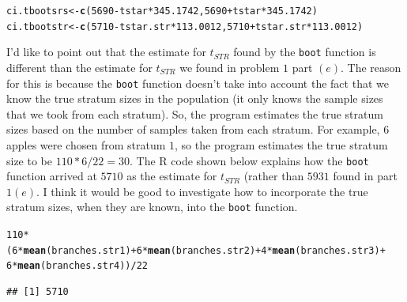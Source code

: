 \documentclass[12pt]{article}\usepackage[]{graphicx}\usepackage[]{color}
\makeatletter
\newcommand{\hlnum}[1]{\textcolor[rgb]{0.686,0.059,0.569}{#1}}%
\newcommand{\hlopt}[1]{\textcolor[rgb]{0,0,0}{#1}}%
\newcommand{\hlstd}[1]{\textcolor[rgb]{0.345,0.345,0.345}{#1}}%
\newcommand{\hlkwb}[1]{\textcolor[rgb]{0.69,0.353,0.396}{#1}}%
\newcommand{\hlkwd}[1]{\textcolor[rgb]{0.737,0.353,0.396}{\textbf{#1}}}%
\newenvironment{kframe}{%
 \def\at@end@of@kframe{}%
 \ifinner\ifhmode%
  \def\at@end@of@kframe{\end{minipage}}%
  \begin{minipage}{\columnwidth}%
 \fi\fi%
 \def\FrameCommand##1{\hskip\@totalleftmargin \hskip-\fboxsep
 \colorbox{shadecolor}{##1}\hskip-\fboxsep
     \hskip-\linewidth \hskip-\@totalleftmargin \hskip\columnwidth}%
 \MakeFramed {\advance\hsize-\width
   \@totalleftmargin\z@ \linewidth\hsize
   \@setminipage}}%
 {\par\unskip\endMakeFramed%
 \at@end@of@kframe}
\newenvironment{knitrout}{}{} %
\makeatother
\begin{document}
\begin{doublespacing}
\begin{enumerate}
\begin{enumerate}
\begin{singlespace}
\begin{knitrout}\footnotesize
{}\color{fgcolor}\begin{kframe}
\begin{alltt}
\hlstd{ci.tbootsrs} \hlkwb{<-} \hlkwd{c}\hlstd{(}\hlnum{5690}\hlopt{-}\hlstd{tstar}\hlopt{*}\hlnum{345.1742}\hlstd{,} \hlnum{5690}\hlopt{+}\hlstd{tstar}\hlopt{*}\hlnum{345.1742}\hlstd{)}
\hlstd{ci.tbootstr} \hlkwb{<-} \hlkwd{c}\hlstd{(}\hlnum{5710}\hlopt{-}\hlstd{tstar.str}\hlopt{*}\hlnum{113.0012}\hlstd{,} \hlnum{5710}\hlopt{+}\hlstd{tstar.str}\hlopt{*}\hlnum{113.0012}\hlstd{)}
\end{alltt}
\end{kframe}
\end{knitrout}
\end{singlespace}

I'd like to point out that the estimate for $t_{STR}$ found by the \verb+boot+ function is different than the estimate for $t_{STR}$ we found in problem $1$ part $(e)$. The reason for this is because the \verb+boot+ function doesn't take into account the fact that we know the true stratum sizes in the population (it only knows the sample sizes that we took from each stratum). So, the program estimates the true stratum sizes based on the number of samples taken from each stratum. For example, $6$ apples were chosen from stratum $1$, so the program estimates the true stratum size to be $110*6/22 = 30$. The R code shown below explains how the \verb+boot+ function arrived at $5710$ as the estimate for $t_{STR}$ (rather than $5931$ found in part $1(e)$. I think it would be good to investigate how to incorporate the true stratum sizes, when they are known, into the \verb+boot+ function.

\begin{singlespace}
\begin{knitrout}\footnotesize
{}\color{fgcolor}\begin{kframe}
\begin{alltt}
\hlnum{110}\hlopt{*}\hlstd{(}\hlnum{6}\hlopt{*}\hlkwd{mean}\hlstd{(branches.str1)}\hlopt{+}\hlnum{6}\hlopt{*}\hlkwd{mean}\hlstd{(branches.str2)}\hlopt{+}\hlnum{4}\hlopt{*}\hlkwd{mean}\hlstd{(branches.str3)}\hlopt{+}
       \hlnum{6}\hlopt{*}\hlkwd{mean}\hlstd{(branches.str4))}\hlopt{/}\hlnum{22}
\end{alltt}
\begin{verbatim}
## [1] 5710
\end{verbatim}
\end{kframe}
\end{knitrout}
\end{singlespace}



\end{enumerate}
\end{enumerate}
\end{doublespacing}
\end{document}
